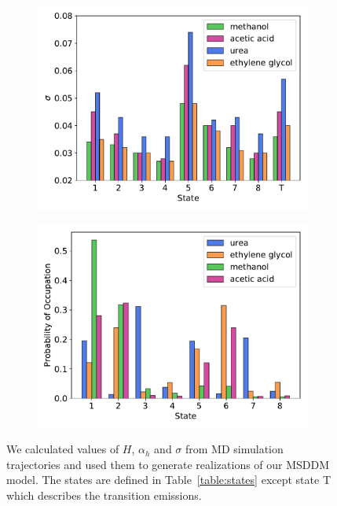 \documentclass{article}
\begin{document}
\begin{figure}
\begin{subfigure}{0.49\textwidth}
  \includegraphics[width=\textwidth]{sigma_v_state.pdf}
  \caption{}\label{fig:sigma_v_state}
  \end{subfigure}
  \begin{subfigure}{0.49\textwidth}
  \includegraphics[width=\textwidth]{state_probabilities.pdf}
  \caption{}\label{fig:state_probabilities}
  \end{subfigure}
  \caption{We calculated values of $H$, $\alpha_h$ and $\sigma$ from MD simulation
  trajectories and used them to generate realizations of our MSDDM model. The states
  are defined in Table~\ref{table:states} except state T which describes the transition
  emissions.}\label{fig:msddm_parameters}
  \end{figure}
  
\end{document}
